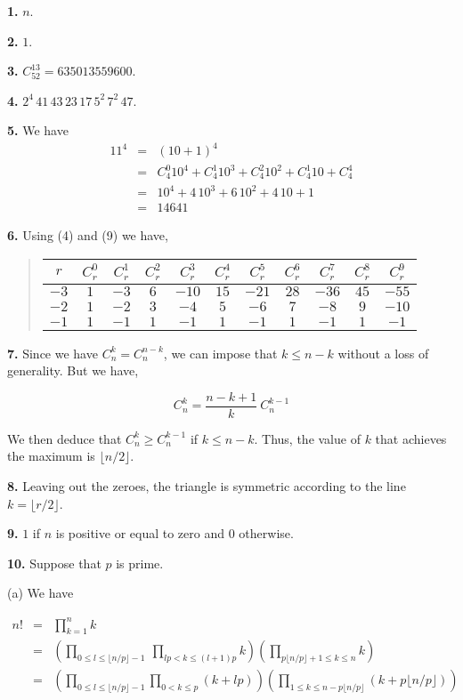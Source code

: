 \documentclass[a4paper,12pt]{article}
\newcommand{\newpar}[1]{\bigskip \noindent \textbf{#1.}}
\newcommand{\subpar}[1]{\medskip \noindent (#1)}
\begin{document}
\newpar{1} $n$.

\newpar{2} $1$.

\newpar{3} $C_{52}^{13} = 635013559600$.

\newpar{4} $2^4\,41\,43\,23\,17\,5^2\,7^2\,47$.

\newpar{5} We have
\begin{eqnarray*}
  11^4 &=& (10 + 1)^4 \\
  &=& C_4^0 10^4 + C_4^1 10^3 + C_4^2 10^2 + C_4^1 10 + C_4^4 \\
  &=& 10^4 + 4\,10^3 + 6\,10^2 + 4\,10 + 1 \\
  &=& 14641
\end{eqnarray*}

\newpar{6} Using (4) and (9) we have,
\begin{quote}
  \begin{tabular}{|c|c|c|c|c|c|c|c|c|c|c|}
    \hline $r$ & $C_r^0$ & $C_r^1$ & $C_r^2$ & $C_r^3$ & $C_r^4$ &
    $C_r^5$ & $C_r^6$ & $C_r^7$ & $C_r^8$ & $C_r^9$ \\
    \hline $-3$ & $1$ & $-3$ & $6$ & $-10$ & $15$ & $-21$ & $28$ &
    $-36$ & $45$ & $-55$ \\
    \hline $-2$ & $1$ & $-2$ & $3$ & $-4$ & $5$ & $-6$ & $7$ & $-8$ &
    $9$ & $-10$ \\
    \hline $-1$ & $1$ & $-1$ & $1$ & $-1$ & $1$ & $-1$ & $1$ & $-1$ &
    $1$ & $-1$ \\
    \hline
  \end{tabular}
\end{quote}

\newpar{7}  Since we have $C_n^k = C_n^{n-k}$, we can impose that $k
\le n-k$ without a loss of generality.  But we have,

\[ C_n^k = \frac{n-k+1}{k}\ C_n^{k-1} \]

We then deduce that $C_n^k \ge C_n^{k-1}$ if $k \le n-k$.  Thus, the
value of $k$ that achieves the maximum is $\lfloor n/2\rfloor$.

\newpar{8} Leaving out the zeroes, the triangle is symmetric according
to the line $k = \lfloor r/2\rfloor$.

\newpar{9} $1$ if $n$ is positive or equal to zero and $0$ otherwise.

\newpar{10} Suppose that $p$ is prime.

\subpar{a} We have

\begin{eqnarray*}
  n! &=& \prod_{k=1}^n k \\
  &=& \left( \prod_{0 \le l \le \lfloor n/p\rfloor - 1}\ \prod_{lp <
    k\le (l+1)p} k \right) \left( \prod_{p \lfloor n/p\rfloor + 1\le k \le
    n} k \right) \\
  &=& \left( \prod_{0\le l \le \lfloor n/p\rfloor - 1} \prod_{0 < k
    \le p} (k+lp) \right) \left( \prod_{1 \le k \le n - p \lfloor n/p \rfloor}
  (k+p\lfloor n/p\rfloor) \right)
\end{eqnarray*}
\end{document}
